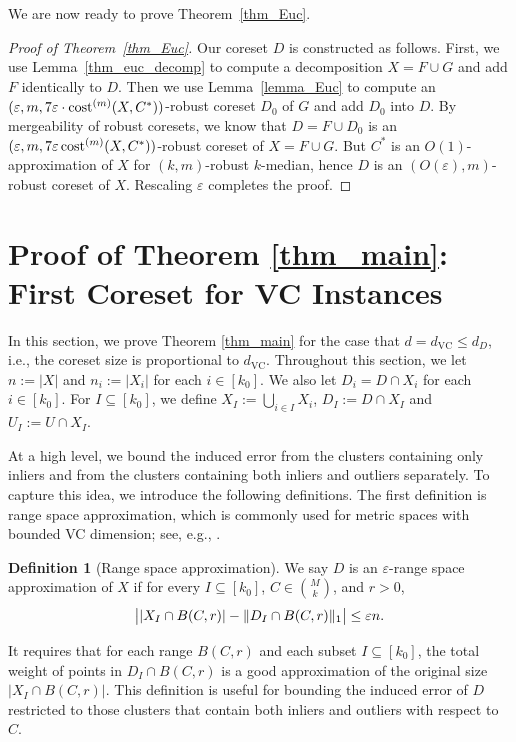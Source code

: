 \documentclass[11pt,letterpaper]{article}
\theoremstyle{definition}
\newtheorem{definition}[theorem]{Definition}
\newcommand{\eps}{\varepsilon}
\newcommand{\VC}{\ensuremath{\mathrm{VC}}}
\DeclarePairedDelimiter{\abs}{\lvert}{\rvert}
\DeclarePairedDelimiter{\norm}{\lVert}{\rVert}
\begin{document}
We are now ready to prove Theorem~\ref{thm_Euc}.

\begin{proof}[Proof of Theorem~\ref{thm_Euc}] Our coreset $D$ is constructed as follows. 
	First, we use Lemma~\ref{thm_euc_decomp} to compute a decomposition $X=F\cup G$ and add $F$ identically to $D$. Then we use Lemma~\ref{lemma_Euc} to compute an $(\eps,m,7\eps\cdot\cost^{(m)}(X,C^\ast))$-robust coreset $D_0$ of $G$ and add $D_0$ into $D$. By mergeability of robust coresets, we know that $D=F\cup D_0$ is an $(\eps,m,7\eps\cost[m](X,C^\ast))$-robust coreset of $X=F\cup G$. But $C^\ast$ is an $O(1)$-approximation of $X$ for $(k,m)$-robust $k$-median, hence $D$ is an $(O(\eps),m)$-robust coreset of $X$. Rescaling $\eps$ completes the proof.
\end{proof}
%
\section{Proof of Theorem \ref{thm_main}: First Coreset for VC Instances}
\label{sec:VC}

In this section, we prove Theorem \ref{thm_main} for the case that $d = d_{\VC}\leq d_D$, i.e., the coreset size is proportional to $d_{\VC}$. Throughout this section, we let $n:=|X|$ and $n_i:=|X_i|$ for each $i\in [k_0]$. We also let $D_i = D\cap X_i$ for each $i\in [k_0]$.
 For $I\subseteq [k_0]$, we define $X_I := \bigcup_{i\in I} X_i$, $D_I := D\cap X_I$ and $U_I := U\cap X_I$.

At a high level, we bound the induced error from the clusters containing only inliers and from the clusters containing both inliers and outliers separately.
%
To capture this idea, we introduce the following definitions.
%
The first definition is range space approximation, which is commonly used for metric spaces with bounded VC dimension; see, e.g., \cite{vershynin2018high}.
%

\begin{definition}[Range space approximation] \label{def_range}
We say $D$ is an $\eps$-range space approximation of $X$ if for every $I\subseteq [k_0]$, $C\in \binom{M}{k}$, and $r>0$,
$$
\abs[\big]{ |X_I\cap B(C,r)| - \norm{D_I\cap B(C,r)}_1 }\leq \eps n.
$$ 
\end{definition}

It requires that for each range $B(C,r)$ and each subset $I\subseteq [k_0]$, the total weight of points in $D_I \cap B(C,r)$ is a good approximation of the original size $|X_I\cap B(C,r)|$.
%
This definition is useful for bounding the induced error of $D$ restricted to those clusters that contain both inliers and outliers with respect to $C$.
%
\end{document}

